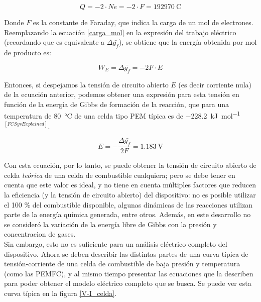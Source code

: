 \begin{equation}\label{carga_mol}
    Q=-2\cdot Ne=-2\cdot F=\SI{192970}{\coulomb}
\end{equation}

Donde $F$ es la constante de Faraday, que indica la carga de un mol de electrones.\\

Reemplazando la ecuación \ref{carga_mol} en la expresión del trabajo eléctrico (recordando que es equivalente a $\Delta\bar{g_f}$), se obtiene que la energía obtenida por mol de producto es:

\begin{equation}\label{trabajo_elec}
    W_E=\Delta\bar{g_f}=-2F\cdot E
\end{equation}

Entonces, si despejamos la tensión de circuito abierto $E$ (es decir corriente nula) de la ecuación anterior, podemos obtener una expresión para esta tensión en función de la energía de Gibbs de formación de la reacción, que para una temperatura de \SI{80}{\celsius} de una celda tipo PEM típica es de \SI{-228.2}{\kilo\joule\per\mole}$^{[FCSysExplained]}$.

\begin{equation}\label{tension_vacio}
    \boxed{E=-\frac{\Delta\bar{g_f}}{2F}=\SI{1.183}{\volt}}
\end{equation}

Con esta ecuación, por lo tanto, se puede obtener la {\Medium tensión de circuito abierto de celda} \textit{teórica} de una celda de combustible cualquiera; pero se debe tener en cuenta que este valor es ideal, y no tiene en cuenta múltiples factores que reducen la eficiencia (y la tensión de circuito abierto) del dispositivo: no es posible utilizar el 100 \% del combustible disponible, algunas dinámicas de las reacciones utilizan parte de la energía química generada, entre otros. Además, en este desarrollo no se consideró la variación de la energía libre de Gibbs con la presión y concentracion de gases.\\

Sin embargo, esto no es suficiente para un análisis eléctrico completo del dispositivo. Ahora se deben describir las distintas partes de una curva típica de tensión-corriente de una celda de combustible de baja presión y temperatura (como las PEMFC), y al mismo tiempo presentar las ecuaciones que la describen para poder obtener el modelo eléctrico completo que se busca. Se puede ver esta curva típica en la figura \ref{V-I_celda}.

